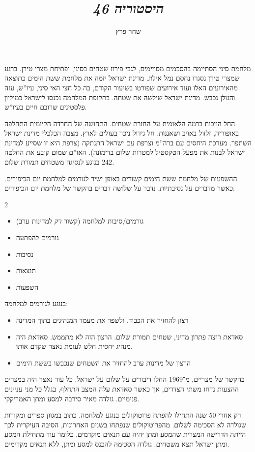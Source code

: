 \documentclass[]{../../../../tex/classes/styledArticle}
\author{שחר פרץ}
\title{\textit{היסטוריה 46}}
\begin{document}
	\maketitle
	מלחמת סיני הסתיימה בהסכמים מסויימים, לגבי פירוז שטחים בסיני, ופתיחת מצרי טירן. ברגע שמצרי טירן נסגרו נחסם נמל אילת. מדינת ישראל יזמה את מלחמת ששת הימים כתוצאה מהאירועים האלו ועוד אירועים שפורטו בשיעור הקודם, בה כל חצי האי סיני, עיו''ש, עזה והגולן נכבש. מדינת ישראל שילשה את שטחה. בתקופת המלחמה נכנסו לישראל כמיליון פלסטינים שרובם חיים בעיו''ש. 
	
	החל הויכוח ברמה הלאומית על החזרת שטחים. התחושה של החרדה הקיומית התחלפה באופוריה, זלזול  באויב ושאננות. חל גידול ניכר בעולים לארץ. מצבה הכלכלי מדינת ישראל השתפר. מערכת היחסים עם ברה''מ וצרפת עם ישראל התנתקה (צרפת היא זו שסייע למדינת ישראל לבנות את מפעל הטקסטיל למטרות שלום בדימונה). האו''ם שמום קובע את החלטה 242 בנוגע לנסיגה משטחים תמורת שלום. 
	
	ההשפעות של מלחמת ששת הימים קשורים באופן ישיר לגורמים למלחמת יום הכיפורים. כאשר מדברים על נסיבתיות, נדבר על שלושה דברים בהקשר של מלחמת יום הכיפורים: 
	\begin{multicols}{2}
		\begin{itemize}
			\item גורמים/סיבות למלחמה (קשור \textit{רק} למדינות ערב)
			\item גורמים להפתעה
			\item נסיבות
			\item תוצאות
			\item השפעות
		\end{itemize}
	\end{multicols}
	
	בנוגע לגורמים למלחמה: 
	\begin{itemize}
		\item רצון להחזיר את הכבוד, ולשפר את מעמד המנהיגים בתוך המדינה
		\item סאדאת רוצה פתרון מדיני, שטחים תמורת שלום. הרצון הזה לא מתממש. סאדאת היה מנהיג יחסית חלש לעומת נאצר שקדם אותו. 
		\item הרצון של מדינות ערב להחזיר את השטחים שנכבשו בששת הימים
	\end{itemize}
	
	בהקשר של מצריים, מ־1969 החלו דיבורים על שלום על ישראל. כל עוד נאצר היה במצרים ההצעות נדחו משתי הצדדים, אך כאשר סאדאת עלה המצב התחלף, בגלל כל מני עניינים פנימיים. גולדה מאיר סירבה למסע ומתן האמריקקי. 
	
	רק אחרי 50 שנה התחילו להפתח פרוטוקולים בנוגע למלחמה. כתוב במגוון ספרים ומקורות שגולדה לא הסכימה לשלום. מהפרוטוקולים שנפתחו בשנים האחרונות, הסיבה העיקרית לכך הייתה הדרישה המצרית שהמסע ומתן יהיה עם תנאים מוקדמים, כלומר עוד מתחילת המסע ומתן ישראל תצא משטחים. גולדה הסכימה להכנס למסע ומתן, ללא תנאים מקדימים. 
	
\end{document}
